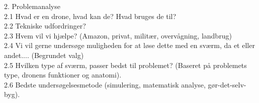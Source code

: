  
 
2. Problemanalyse\\
 2.1 Hvad er en drone, hvad kan de? Hvad bruges de til?\\
 2.2 Tekniske udfordringer? \\
 2.3 Hvem vil vi hjælpe? (Amazon, privat, militær, overvågning, landbrug)\\
 2.4 Vi vil gerne undersøge muligheden for at løse dette med en sværm, da et eller andet.... (Begrundet valg)\\
 2.5 Hvilken type af sværm, passer bedst til problemet? (Baseret på problemets type, dronens funktioner og anatomi).\\
 2.6 Bedste undersøgelsesmetode (simulering, matematisk analyse, gør-det-selv-byg).\\
